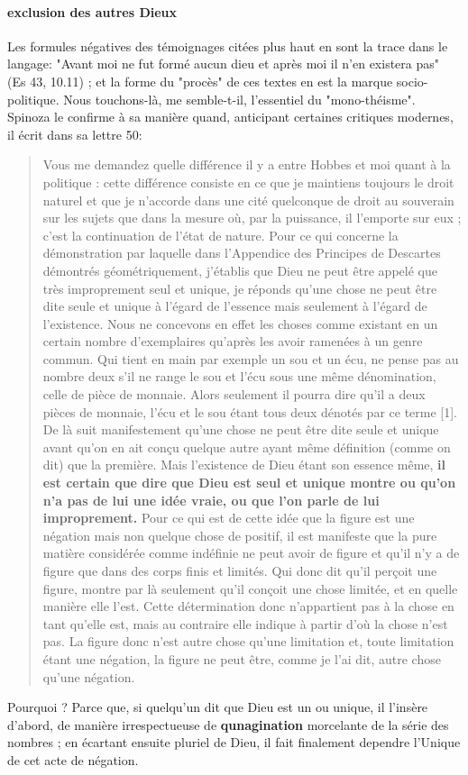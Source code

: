 \paragraph{exclusion des autres Dieux}
Les formules négatives des témoignages citées plus haut en sont la trace dans le langage: "Avant moi ne fut formé aucun dieu et après moi il n'en existera pas" (Es 43, 10.11) ; et la forme du "procès" de ces textes en est la marque socio-politique. Nous touchons-là, me semble-t-il, l'essentiel du "mono-théisme". Spinoza le confirme à sa manière quand, anticipant certaines critiques modernes, il écrit dans sa lettre 50:
\begin{quote}
Vous me demandez quelle différence il y a entre Hobbes et moi quant à la politique : cette différence consiste en ce que je maintiens toujours le droit naturel et que je n’accorde dans une cité quelconque de droit au souverain sur les sujets que dans la mesure où, par la puissance, il l’emporte sur eux ; c’est la continuation de l’état de nature.
Pour ce qui concerne la démonstration par laquelle dans l’Appendice des Principes de Descartes démontrés géométriquement, j’établis que Dieu ne peut être appelé que très improprement seul et unique, je réponds qu’une chose ne peut être dite seule et unique à l’égard de l’essence mais seulement à l’égard de l’existence. Nous ne concevons en effet les choses comme existant en un certain nombre d’exemplaires qu’après les avoir ramenées à un genre commun. Qui tient en main par exemple un sou et un écu, ne pense pas au nombre deux s’il ne range le sou et l’écu sous une même dénomination, celle de pièce de monnaie. Alors seulement il pourra dire qu’il a deux pièces de monnaie, l’écu et le sou étant tous deux dénotés par ce terme [1].
De là suit manifestement qu’une chose ne peut être dite seule et unique avant qu’on en ait conçu quelque autre ayant même définition (comme on dit) que la première. Mais l’existence de Dieu étant son essence même, \textbf{il est certain que dire que Dieu est seul et unique montre ou qu’on n’a pas de lui une idée vraie, ou que l’on parle de lui improprement.}
Pour ce qui est de cette idée que la figure est une négation mais non quelque chose de positif, il est manifeste que la pure matière considérée comme indéfinie ne peut avoir de figure et qu’il n’y a de figure que dans des corps finis et limités. Qui donc dit qu’il perçoit une figure, montre par là seulement qu’il conçoit une chose limitée, et en quelle manière elle l’est. Cette détermination donc n’appartient pas à la chose en tant qu’elle est, mais au contraire elle indique à partir d’où la chose n’est pas. La figure donc n’est autre chose qu’une limitation et, toute limitation étant une négation, la figure ne peut être, comme je l’ai dit, autre chose qu’une négation.
 
\end{quote}
Pourquoi ? Parce que, si quelqu'un dit que Dieu est un ou unique, il l'insère d'abord, de manière irrespectueuse de \textbf{qunagination} morcelante de la série des nombres ; en écartant ensuite pluriel de Dieu, il fait finalement dependre l'Unique de cet acte de négation.
